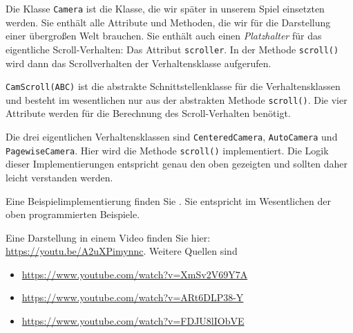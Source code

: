 Die Klasse \texttt{Camera} ist die Klasse, die wir später in unserem Spiel einsetzten werden. Sie enthält alle Attribute und Methoden, die wir für die Darstellung einer übergroßen Welt brauchen. Sie enthält auch einen \emph{Platzhalter} für das eigentliche Scroll-Verhalten: Das Attribut \texttt{scroller}. In der Methode \texttt{scroll()} wird dann das Scrollverhalten der Verhaltensklasse aufgerufen.


\texttt{CamScroll(ABC)} ist die abstrakte Schnittstellenklasse für die Verhaltensklassen und besteht im wesentlichen nur aus der abstrakten Methode \texttt{scroll()}. Die vier Attribute werden für die Berechnung des Scroll-Verhalten benötigt.


Die drei eigentlichen Verhaltensklassen sind \texttt{CenteredCamera}, \texttt{AutoCamera} und \texttt{Page\-wise\-Camera}. Hier wird die Methode \texttt{scroll()} implementiert. Die Logik dieser Implementierungen entspricht genau den oben gezeigten und sollten daher leicht verstanden werden.


Eine Beispielimplementierung finden Sie . Sie entspricht im Wesentlichen der oben programmierten Beispiele.


Eine Darstellung in einem Video finden Sie hier: \href{https://youtu.be/A2uXPimynnc}{https://youtu.be/A2uXPimynnc}. Weitere Quellen sind 

\begin{itemize}
	\item \href{https://www.youtube.com/watch?v=XmSv2V69Y7A}{https://www.youtube.com/watch?v=XmSv2V69Y7A}
	\item \href{https://www.youtube.com/watch?v=ARt6DLP38-Y}{https://www.youtube.com/watch?v=ARt6DLP38-Y}
	\item \href{https://www.youtube.com/watch?v=FDJU8lIObVE}{https://www.youtube.com/watch?v=FDJU8lIObVE}
\end{itemize}

